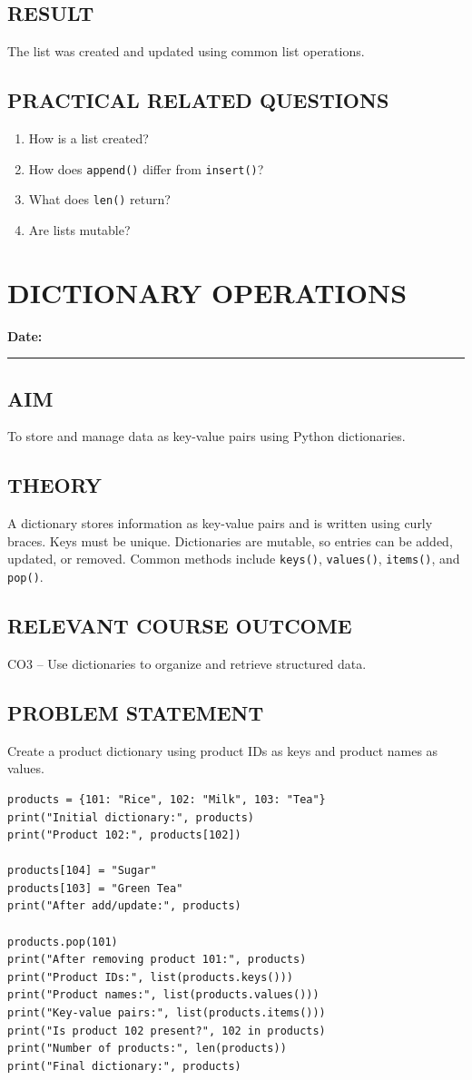 \documentclass[12pt,a4paper]{report}
\newcommand{\experimentdate}{\hfill\textbf{Date:} \rule{3cm}{0.4pt}}
\newcommand{\aim}[1]{\section*{AIM}#1}
\newcommand{\result}[1]{\section*{RESULT}#1}
\newcommand{\courseoutcome}[1]{\section*{RELEVANT COURSE OUTCOME}#1}
\newcommand{\questions}[1]{\section*{PRACTICAL RELATED QUESTIONS}#1}
\begin{document}
\result{The list was created and updated using common list operations.}

\questions{
\begin{enumerate}
\item How is a list created?
\item How does \texttt{append()} differ from \texttt{insert()}?
\item What does \texttt{len()} return?
\item Are lists mutable?
\end{enumerate}}

\chapter{DICTIONARY OPERATIONS}
\experimentdate

\aim{To store and manage data as key-value pairs using Python dictionaries.}

\section*{THEORY}
A dictionary stores information as key-value pairs and is written using curly braces.
Keys must be unique. Dictionaries are mutable, so entries can be added, updated, or
removed. Common methods include \texttt{keys()}, \texttt{values()}, \texttt{items()},
and \texttt{pop()}.

\courseoutcome{CO3 -- Use dictionaries to organize and retrieve structured data.}

\section*{PROBLEM STATEMENT}
Create a product dictionary using product IDs as keys and product names as values.

\begin{lstlisting}
products = {101: "Rice", 102: "Milk", 103: "Tea"}
print("Initial dictionary:", products)
print("Product 102:", products[102])

products[104] = "Sugar"
products[103] = "Green Tea"
print("After add/update:", products)

products.pop(101)
print("After removing product 101:", products)
print("Product IDs:", list(products.keys()))
print("Product names:", list(products.values()))
print("Key-value pairs:", list(products.items()))
print("Is product 102 present?", 102 in products)
print("Number of products:", len(products))
print("Final dictionary:", products)
\end{lstlisting}
\end{document}
